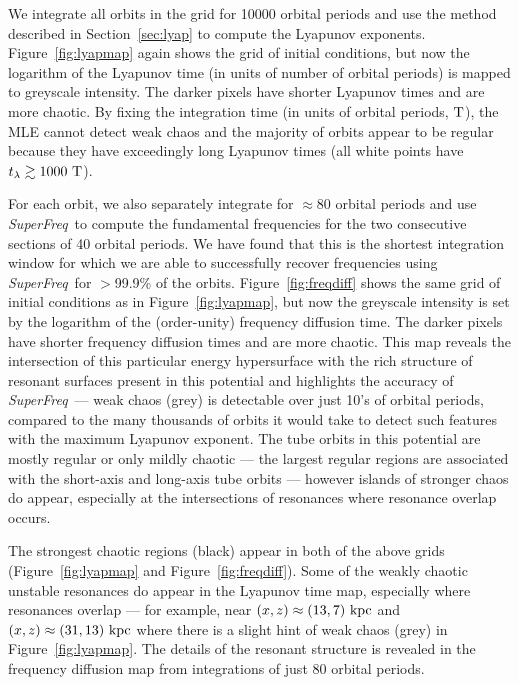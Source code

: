 \documentclass[letterpaper,12pt,preprint]{aastex}
\newcommand{\periods}{\ensuremath{{\rm T}}}
\newcommand{\project}[1]{\textsl{#1}}
\newcommand{\superfreq}{\project{SuperFreq}}
\begin{document}
We integrate all orbits in the grid for 10000 orbital periods and use the method described in Section~\ref{sec:lyap} to compute the Lyapunov exponents. Figure~\ref{fig:lyapmap} again shows the grid of initial conditions, but now the logarithm of the Lyapunov time (in units of number of orbital periods) is mapped to greyscale intensity. The darker pixels have shorter Lyapunov times and are more chaotic. By fixing the integration time (in units of orbital periods, $\periods$), the MLE cannot detect weak chaos and the majority of orbits appear to be regular because they have exceedingly long Lyapunov times (all white points have $t_\lambda \gtrsim 1000~\periods$). 

For each orbit, we also separately integrate for $\approx$80 orbital periods and use \superfreq\ to compute the fundamental frequencies for the two consecutive sections of 40 orbital periods. We have found that this is the shortest integration window for which we are able to successfully recover frequencies using \superfreq\ for $>$99.9\% of the orbits. Figure~\ref{fig:freqdiff} shows the same grid of initial conditions as in Figure~\ref{fig:lyapmap}, but now the greyscale intensity is set by the logarithm of the (order-unity) frequency diffusion time. The darker pixels have shorter frequency diffusion times and are more chaotic. This map reveals the intersection of this particular energy hypersurface with the rich structure of resonant surfaces present in this potential and highlights the accuracy of \superfreq\ --- weak chaos (grey) is detectable over just 10's of orbital periods, compared to the many thousands of orbits it would take to detect such features with the maximum Lyapunov exponent. The tube orbits in this potential are mostly regular or only mildly chaotic --- the largest regular regions are associated with the short-axis and long-axis tube orbits --- however islands of stronger chaos do appear, especially at the intersections of resonances where resonance overlap occurs. 

The strongest chaotic regions (black) appear in both of the above grids (Figure~\ref{fig:lyapmap} and Figure~\ref{fig:freqdiff}). Some of the weakly chaotic unstable resonances do appear in the Lyapunov time map, especially where resonances overlap --- for example, near $(x,z) \approx(13,7)~{\rm kpc}$ and $(x,z) \approx(31,13)~{\rm kpc}$ where there is a slight hint of weak chaos (grey) in Figure~\ref{fig:lyapmap}. The details of the resonant structure is revealed in the frequency diffusion map from integrations of just 80 orbital periods. 
\end{document}
